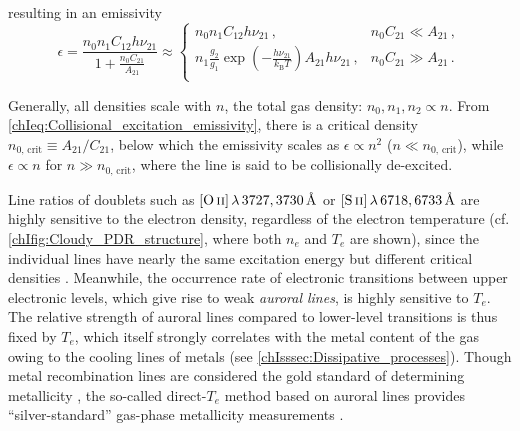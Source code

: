\noindent resulting in an emissivity
\begin{equation}
    \label{chIeq:Collisional_excitation_emissivity}
    \epsilon = \frac{n_0 n_1 C_{12} h \nu_{21}}{1 + \frac{n_0 C_{21}}{A_{21}}} \approx \left\{
    \begin{array}{ll}
         n_0 n_1 C_{12} h \nu_{21} \, , & n_0 C_{21} \ll A_{21} \, , \\
        
         n_1 \frac{g_2}{g_1} \exp \left( - \frac{h \nu_{21}}{k_\text{B} T} \right) A_{21} h \nu_{21} \, , & n_0 C_{21} \gg A_{21} \, . \\
    \end{array}
    \right.
\end{equation}

Generally, all densities scale with $n$, the total gas density: $n_0, n_1, n_2 \propto n$. From \cref{chIeq:Collisional_excitation_emissivity}, there is a critical density $n_{0, \, \text{crit}} \equiv A_{21}/C_{21}$, below which the emissivity scales as $\epsilon \propto n^2$ ($n \ll n_{0, \, \text{crit}}$), while $\epsilon \propto n$ for $n \gg n_{0, \, \text{crit}}$, where the line is said to be collisionally de-excited.

Line ratios of doublets such as $\OII \, \lambda \, 3727, 3730 \, \Angstrom$ or $\SII \, \lambda \, 6718, 6733 \, \Angstrom$ are highly sensitive to the electron density, regardless of the electron temperature (cf. \cref{chIfig:Cloudy_PDR_structure}, where both $n_e$ and $T_e$ are shown), since the individual lines have nearly the same excitation energy but different critical densities . Meanwhile, the occurrence rate of electronic transitions between upper electronic levels, which give rise to weak \textit{auroral lines}, is highly sensitive to $T_e$. The relative strength of auroral lines compared to lower-level transitions is thus fixed by $T_e$, which itself strongly correlates with the metal content of the gas owing to the cooling lines of metals (see \cref{chIsssec:Dissipative_processes}). Though metal recombination lines are considered the gold standard of determining metallicity \citep[yet are practically unviable for distant galaxies;][]{2019ARA&A..57..511K}, the so-called direct-$T_e$ method based on auroral lines provides ``silver-standard'' gas-phase metallicity measurements \citep[e.g.][]{2016ApJ...825L..23S, 2021ApJ...914...19S, 2017MNRAS.465.1384C, 2022arXiv220712375C}.

